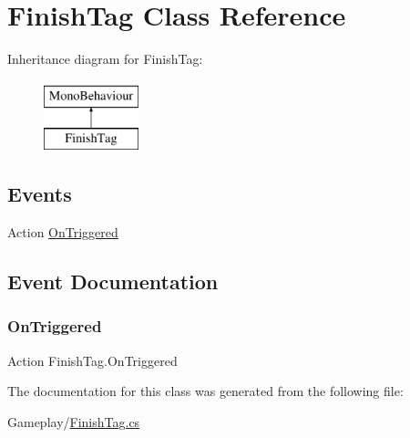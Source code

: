 \hypertarget{class_finish_tag}{}\section{Finish\+Tag Class Reference}
\label{class_finish_tag}
Inheritance diagram for Finish\+Tag\+:\begin{figure}[H]
\begin{center}
\leavevmode
\includegraphics[height=2.000000cm]{class_finish_tag}
\end{center}
\end{figure}
\subsection*{Events}
\begin{DoxyCompactItemize}
\item 
Action \mbox{\hyperlink{class_finish_tag_aca3535fa5513ab8eb91aa6e907728897}{On\+Triggered}}
\end{DoxyCompactItemize}


\subsection{Event Documentation}
\mbox{\label{class_finish_tag_aca3535fa5513ab8eb91aa6e907728897}} 
\subsubsection{\texorpdfstring{On\+Triggered}{OnTriggered}}
{\footnotesize\ttfamily Action Finish\+Tag.\+On\+Triggered}



The documentation for this class was generated from the following file\+:\begin{DoxyCompactItemize}
\item 
Gameplay/\mbox{\hyperlink{_finish_tag_8cs}{Finish\+Tag.\+cs}}\end{DoxyCompactItemize}
